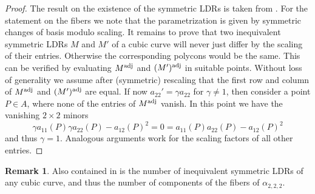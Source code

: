 \documentclass[a4paper,10pt]{amsart}
\theoremstyle{definition}
\newtheorem{rem}[defin]{Remark}
\theoremstyle{plain}
\begin{document}
\begin{proof}
 The result on the existence of the symmetric LDRs is taken from \cite[Table 7]{Piontkowski2006singLDR}. For the statement on the fibers we note that the parametrization is given by symmetric changes of basis modulo scaling. It remains to prove that two inequivalent symmetric LDRs $M$ and $M'$ of a cubic curve will never just differ by the scaling of their entries. Otherwise the corresponding polycons would be the same. This can be verified by evaluating $M^{\textup{adj}}$ and $(M')^{\textup{adj}}$ in suitable points. Without loss of generality we assume after (symmetric) rescaling that the first row and column of $M^{\textup{adj}}$ and $(M')^{\textup{adj}}$ are equal. If now $a_{22}' = \gamma a_{22}$ for $\gamma \neq 1$, then consider a point $P \in A$, where none of the entries of $M^{\textup{adj}}$ vanish. In this point we have the vanishing $2\times2$ minors
 \begin{equation*}
     \gamma a_{11}(P)\gamma a_{22}(P) - a_{12}(P)^2 = 0 = a_{11}(P)a_{22}(P) - a_{12}(P)^2
 \end{equation*}
 and thus $\gamma = 1$. Analogous arguments work for the scaling factors of all other entries.
\end{proof}

\begin{rem}
 Also contained in \cite[Table 7]{Piontkowski2006singLDR} is the number of inequivalent symmetric LDRs of any cubic curve, and thus the number of components of the fibers of $\alpha_{2,2,2}$.
\end{rem}
\end{document}
